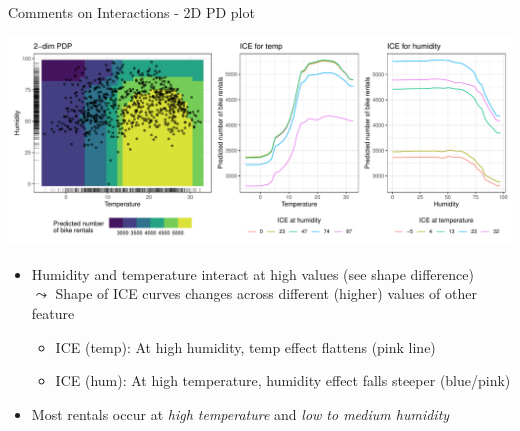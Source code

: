 \documentclass[11pt,compress,t,notes=noshow, aspectratio=169, xcolor=table]{beamer}
\begin{document}
\begin{frame}{Comments on Interactions - 2D PD plot}

\begin{center}
\includegraphics[width=\textwidth]{figure/pdp2d_bike}
\end{center}

\begin{itemize}
 \item Humidity and temperature interact at high values (see shape difference)\\
 $\leadsto$ Shape of ICE curves changes across different (higher) values of other feature%
  \begin{itemize}
    \item ICE (temp): At high humidity, temp effect flattens (pink line)
    \item ICE (hum): At high temperature, humidity effect falls steeper (blue/pink)
  \end{itemize}

 \item Most rentals occur at \textit{high temperature} and \textit{low to medium humidity}
\end{itemize}


%

\end{frame}
\end{document}
